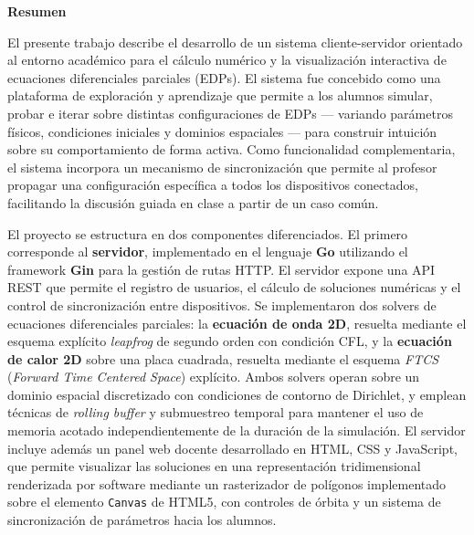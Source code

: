 \documentclass[12pt, a4paper]{article}
\begin{document}
\begin{center}
    {\large\bfseries Resumen}
\end{center}

\vspace{0.6cm}

El presente trabajo describe el desarrollo de un sistema cliente-servidor orientado al
entorno académico para el cálculo numérico y la visualización interactiva de ecuaciones
diferenciales parciales (EDPs). El sistema fue concebido como una plataforma de
exploración y aprendizaje que permite a los alumnos simular, probar e iterar sobre
distintas configuraciones de EDPs — variando parámetros físicos, condiciones iniciales
y dominios espaciales — para construir intuición sobre su comportamiento de forma
activa. Como funcionalidad complementaria, el sistema incorpora un mecanismo de
sincronización que permite al profesor propagar una configuración específica a todos
los dispositivos conectados, facilitando la discusión guiada en clase a partir de un
caso común.

El proyecto se estructura en dos componentes diferenciados. El primero corresponde al
\textbf{servidor}, implementado en el lenguaje \textbf{Go} utilizando el framework
\textbf{Gin} para la gestión de rutas HTTP. El servidor expone una API REST que permite
el registro de usuarios, el cálculo de soluciones numéricas y el control de
sincronización entre dispositivos. Se implementaron dos solvers de ecuaciones
diferenciales parciales: la \textbf{ecuación de onda 2D}, resuelta mediante el esquema
explícito \textit{leapfrog} de segundo orden con condición CFL, y la
\textbf{ecuación de calor 2D} sobre una placa cuadrada, resuelta mediante el esquema
\textit{FTCS} (\textit{Forward Time Centered Space}) explícito. Ambos solvers operan
sobre un dominio espacial discretizado con condiciones de contorno de Dirichlet, y
emplean técnicas de \textit{rolling buffer} y submuestreo temporal para mantener el
uso de memoria acotado independientemente de la duración de la simulación. El servidor
incluye además un panel web docente desarrollado en HTML, CSS y JavaScript, que permite
visualizar las soluciones en una representación tridimensional renderizada por software
mediante un rasterizador de polígonos implementado sobre el elemento \texttt{Canvas} de
HTML5, con controles de órbita y un sistema de sincronización de parámetros hacia los
alumnos.
\end{document}
